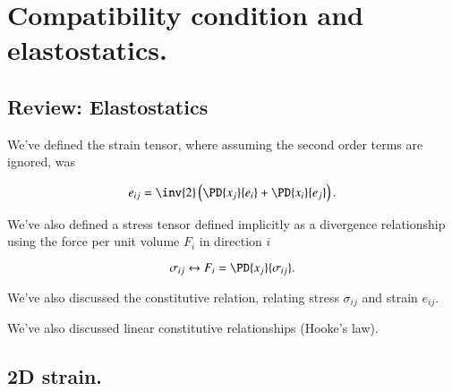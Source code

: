 %
%

\chapter{Compatibility condition and elastostatics.}
\label{chap:continuumL6}
{}
\date{Jan 27, 2012}

\beginArtWithToc

%

\section{Review: Elastostatics}

We've defined the strain tensor, where assuming the second order terms are ignored, was

\begin{equation}\label{eqn:continuumL6:10}
e_{ij} = 
\inv{2} \left( 
\PD{x_j}{e_i}
+ \PD{x_i}{e_j} \right).
\end{equation}

We've also defined a stress tensor defined implicitly as a divergence relationship using the force per unit volume $F_i$ in direction $i$

\begin{equation}\label{eqn:continuumL6:30}
\sigma_{ij} \leftrightarrow F_i = \PD{x_j}{\sigma_{ij}}.
\end{equation}

We've also discussed the constitutive relation, relating stress $\sigma_{ij}$ and strain $e_{ij}$.

We've also discussed linear constitutive relationships (Hooke's law).  

\section{2D strain.}

